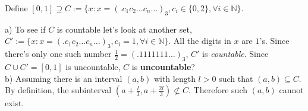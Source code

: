 \documentclass[boxes, qed]{homework}
\begin{document}
\newenvironment{amatrix}[1]{%
  \left[\begin{array}{@{}*{#1}{c}|c@{}}
}{%
  \end{array}\right]
}

\newenvironment{augmatrix}[1]{%
  \left[\begin{array}{#1}
}{%
  \end{array}\right]
}

\begin{problem}Define $[0,1]\supseteq C:=
  \{
    x:x=(.c_1c_2\dots{c_n}\dots)_3, 
    c_i\in\{0,2\},
    \forall{i\in{\mathbb{N}}}
  \}$.
\end{problem}
\begin{solution}a) To see if $C$ is countable
  let's look at another set,
  $C':=\{
    x:x=(.c_1c_2\dots{c_n}\dots)_3,
    c_i=1,
    \forall{i\in{\mathbb{N}}}
  \}$.
  All the digits in $x$ are $1$'s. Since there's only one such
  number $\frac{1}{2}=(.1111111\dots)_3$, $C'$ is \textit{countable}.
  Since $C\cup{C'} = [0,1]$ is uncountable, $C$ is 
  \textbf{uncountable}?\\

  b) Assuming there is an interval $(a, b)$ with length $l>0$
  such that $(a, b)\subseteq{C}$. By definition, 
  the subinterval $(a+\frac{l}{3},a+\frac{2l}{3})\not\subset{C}$.
  Therefore such $(a,b)$ cannot exist.
\end{solution}
\end{document}
